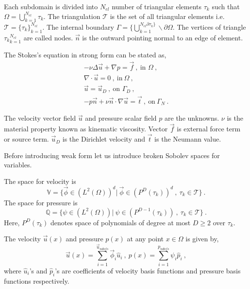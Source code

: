 \documentclass[graybox]{svmult}
\begin{document}
Each subdomain is divided into $N_{el}$ number of triangular elements $\tau_k$ such that $\Omega = \bigcup\limits_{k=1}^{N_{el}} \tau_k$. The triangulation $\mathcal{T}$ is the set of all triangular elements i.e. $\mathcal{T} = \lbrace \tau_k \rbrace_{k=1}^{N_{el}}$. The internal boundary $\Gamma = \lbrace \bigcup\limits_{k=1}^{N_{el} \partial \tau_k \rbrace} \backslash \partial \Omega$. The vertices of triangle ${\tau_k}_{k=1}^{N_{el}}$ are called nodes. $\overrightarrow{n}$ is the outward pointing normal to an edge of element.

The Stokes's equation in strong form can be stated as,
\begin{gather}\label{stokes_strong_form}
-\nu \Delta \overrightarrow{u} + \nabla p = \overrightarrow{f} \ , \ \text{in } \Omega \ , \\
\nabla \cdot \overrightarrow{u} = 0 \ , \ \text{in} \ \Omega \ , \\
\overrightarrow{u} = \overrightarrow{u}_D \ , \ \text{on } \Gamma_D \ , \\
-p \overrightarrow{n} + \nu \overrightarrow{n} \cdot \nabla \overrightarrow{u} = \overrightarrow{t} \ , \ \text{on} \ \Gamma_N \ .
\end{gather}

The velocity vector field $\overrightarrow{u}$ and pressure scalar field $p$ are the unknowns. $\nu$ is the material property known as kinematic viscosity. Vector $\overrightarrow{f}$ is external force term or source term. $\overrightarrow{u}_D$ is the Dirichlet velocity and $\overrightarrow{t}$ is the Neumann value.

Before introducing weak form let us introduce broken Sobolev spaces for variables.

The space for velocity is 
\begin{equation} \label{velocity_test}
\mathbb{V} = \lbrace \overrightarrow{\phi} \in (L^2(\Omega))^d | \ \overrightarrow{\phi} \in (P^D(\tau_k))^d \ , \ \tau_k \in \mathcal{T} \rbrace \ .
\end{equation}
The space for pressure is 
\begin{equation} \label{pressure_test}
\mathbb{Q} = \lbrace \psi \in (L^2(\Omega)) | \ \psi \in (P^{D-1}(\tau_k)) \ , \ \tau_k \in \mathcal{T} \rbrace \ .
\end{equation}
Here, $P^D(\tau_k)$ denotes space of polynomials of degree at most $D \geq 2$ over $\tau_k$.

The velocity $\overrightarrow{u}(x)$ and pressure $p(x)$ at any point $x \in \Omega$ is given by,
\begin{equation}\label{velocity_pressure_coefficients}
\overrightarrow{u}(x) = \sum\limits_{i=1}^{\overrightarrow{u}_{ndofs}} \overrightarrow{\phi}_i \hat{u}_i \ , \
p(x) = \sum\limits_{i=1}^{p_{ndofs}} \psi_i \hat{p}_i \ ,
\end{equation}
where $\hat{u}_i$'s and $\hat{p}_i$'s are coefficients of velocity basis functions and pressure basis functions respectively. 
\end{document}
